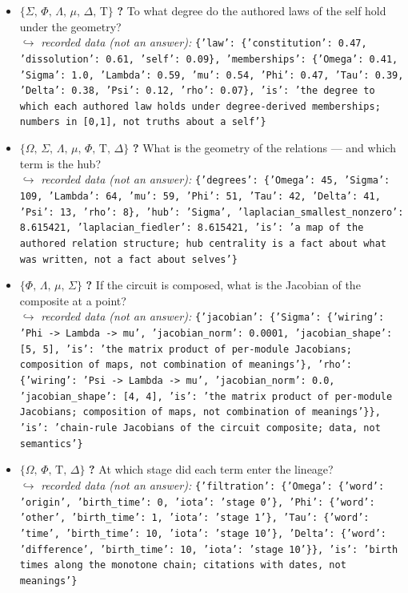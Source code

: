 \documentclass[11pt]{article}
\newcommand{\Tau}{\mathrm{T}}
\begin{document}
\begin{itemize}
\item $\{\Sigma,\,\Phi,\,\Lambda,\,\mu,\,\Delta,\,\Tau\}$ \quad \textbf{?} To what degree do the authored laws of the self hold under the geometry? \\ \hspace*{1em}$\hookrightarrow$ \emph{recorded data (not an answer):} \texttt{\{'law': \{'constitution': 0.47, 'dissolution': 0.61, 'self': 0.09\}, 'memberships': \{'Omega': 0.41, 'Sigma': 1.0, 'Lambda': 0.59, 'mu': 0.54, 'Phi': 0.47, 'Tau': 0.39, 'Delta': 0.38, 'Psi': 0.12, 'rho': 0.07\}, 'is': 'the degree to which each authored law holds under degree-derived memberships; numbers in [0,1], not truths about a self'\}}
\item $\{\Omega,\,\Sigma,\,\Lambda,\,\mu,\,\Phi,\,\Tau,\,\Delta\}$ \quad \textbf{?} What is the geometry of the relations — and which term is the hub? \\ \hspace*{1em}$\hookrightarrow$ \emph{recorded data (not an answer):} \texttt{\{'degrees': \{'Omega': 45, 'Sigma': 109, 'Lambda': 64, 'mu': 59, 'Phi': 51, 'Tau': 42, 'Delta': 41, 'Psi': 13, 'rho': 8\}, 'hub': 'Sigma', 'laplacian\_smallest\_nonzero': 8.615421, 'laplacian\_fiedler': 8.615421, 'is': 'a map of the authored relation structure; hub centrality is a fact about what was written, not a fact about selves'\}}
\item $\{\Phi,\,\Lambda,\,\mu,\,\Sigma\}$ \quad \textbf{?} If the circuit is composed, what is the Jacobian of the composite at a point? \\ \hspace*{1em}$\hookrightarrow$ \emph{recorded data (not an answer):} \texttt{\{'jacobian': \{'Sigma': \{'wiring': 'Phi -> Lambda -> mu', 'jacobian\_norm': 0.0001, 'jacobian\_shape': [5, 5], 'is': 'the matrix product of per-module Jacobians; composition of maps, not combination of meanings'\}, 'rho': \{'wiring': 'Psi -> Lambda -> mu', 'jacobian\_norm': 0.0, 'jacobian\_shape': [4, 4], 'is': 'the matrix product of per-module Jacobians; composition of maps, not combination of meanings'\}\}, 'is': 'chain-rule Jacobians of the circuit composite; data, not semantics'\}}
\item $\{\Omega,\,\Phi,\,\Tau,\,\Delta\}$ \quad \textbf{?} At which stage did each term enter the lineage? \\ \hspace*{1em}$\hookrightarrow$ \emph{recorded data (not an answer):} \texttt{\{'filtration': \{'Omega': \{'word': 'origin', 'birth\_time': 0, 'iota': 'stage 0'\}, 'Phi': \{'word': 'other', 'birth\_time': 1, 'iota': 'stage 1'\}, 'Tau': \{'word': 'time', 'birth\_time': 10, 'iota': 'stage 10'\}, 'Delta': \{'word': 'difference', 'birth\_time': 10, 'iota': 'stage 10'\}\}, 'is': 'birth times along the monotone chain; citations with dates, not meanings'\}}

\end{itemize}
\end{document}
